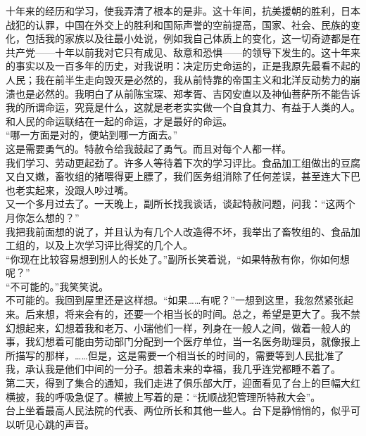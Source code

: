 十年来的经历和学习，使我弄清了根本的是非。这十年间，抗美援朝的胜利，日本战犯的认罪，中国在外交上的胜利和国际声誉的空前提高，国家、社会、民族的变化，包括我的家族以及往最小处说，例如我自己体质上的变化，这一切奇迹都是在共产党——十年以前我对它只有成见、敌意和恐惧——的领导下发生的。这十年来的事实以及一百多年的历史，对我说明：决定历史命运的，正是我原先最看不起的人民；我在前半生走向毁灭是必然的，我从前恃靠的帝国主义和北洋反动势力的崩溃也是必然的。我明白了从前陈宝琛、郑孝胥、吉冈安直以及神仙菩萨所不能告诉我的所谓命运，究竟是什么，这就是老老实实做一个自食其力、有益于人类的人。和人民的命运联结在一起的命运，才是最好的命运。\\

“哪一方面是对的，便站到哪一方面去。”\\

这是需要勇气的。特赦令给我鼓起了勇气。而且对每个人都一样。\\

我们学习、劳动更起劲了。许多人等待着下次的学习评比。食品加工组做出的豆腐又白又嫩，畜牧组的猪喂得更上膘了，我们医务组消除了任何差误，甚至连大下巴也老实起来，没跟人吵过嘴。\\

又一个多月过去了。一天晚上，副所长找我谈话，谈起特赦问题，问我：“这两个月你怎么想的？”\\

我把我前面想的说了，并且认为有几个人改造得不坏，我举出了畜牧组的、食品加工组的，以及上次学习评比得奖的几个人。\\

“你现在比较容易想到别人的长处了。”副所长笑着说，“如果特赦有你，你如何想呢？”\\

“不可能的。”我笑笑说。\\

不可能的。我回到屋里还是这样想。“如果……有呢？”一想到这里，我忽然紧张起来。后来想，将来会有的，还要一个相当长的时间。总之，希望是更大了。我不禁幻想起来，幻想着我和老万、小瑞他们一样，列身在一般人之间，做着一般人的事，我幻想着可能由劳动部门分配到一个医疗单位，当一名医务助理员，就像报上所描写的那样，……但是，这是需要一个相当长的时间的，需要等到人民批准了我，承认我是他们中间的一分子。想着未来的幸福，我几乎连党都睡不着了。\\

第二天，得到了集合的通知，我们走进了俱乐部大厅，迎面看见了台上的巨幅大红横披，我的呼吸急促了。横披上写着的是：“抚顺战犯管理所特赦大会”。\\

台上坐着最高人民法院的代表、两位所长和其他一些人。台下是静悄悄的，似乎可以听见心跳的声音。\\

